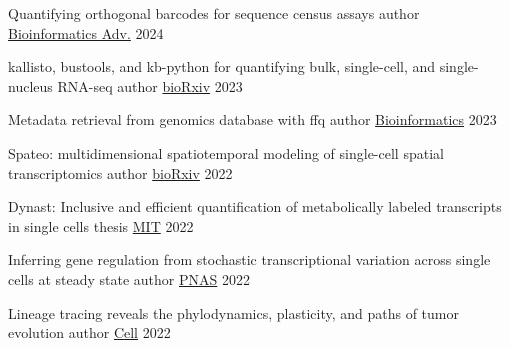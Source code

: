 

\begin{cvhonors}


  \cvhonor
    {Quantifying orthogonal barcodes for sequence census assays} %
    {author} %
    {\href{https://doi.org/10.1093/bioadv/vbad181}{Bioinformatics Adv.}} %
    {2024} %

  \cvhonor
    {kallisto, bustools, and kb-python for quantifying bulk, single-cell, and single-nucleus RNA-seq} %
    {author} %
    {\href{https://doi.org/10.1101/2023.11.21.568164}{bioRxiv}} %
    {2023} %

  \cvhonor
    {Metadata retrieval from genomics database with ffq} %
    {author} %
    {\href{https://doi.org/10.1093/bioinformatics/btac667}{Bioinformatics}} %
    {2023} %

  \cvhonor
    {Spateo: multidimensional spatiotemporal modeling of single-cell spatial transcriptomics} %
    {author} %
    {\href{https://doi.org/10.1101/2022.12.07.519417}{bioRxiv}} %
    {2022} %

  \cvhonor
    {Dynast: Inclusive and efficient quantification of metabolically labeled transcripts in single cells} %
    {thesis} %
    {\href{https://hdl.handle.net/1721.1/147475}{MIT}} %
    {2022} %

  \cvhonor
    {Inferring gene regulation from stochastic transcriptional variation across single cells at steady state} %
    {author} %
    {\href{https://doi.org/10.1073/pnas.2207392119}{PNAS}} %
    {2022} %

  \cvhonor
    {Lineage tracing reveals the phylodynamics, plasticity, and paths of tumor evolution} %
    {author} %
    {\href{https://doi.org/10.1016/j.cell.2022.04.015}{Cell}} %
    {2022} %


\end{cvhonors}
